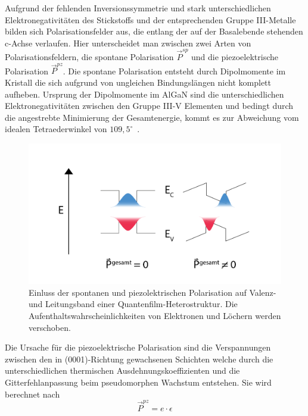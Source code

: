 Aufgrund der fehlenden Inversionssymmetrie und stark unterschiedlichen Elektronegativitäten des Stickstoffs und der entsprechenden Gruppe III-Metalle bilden sich Polarisationsfelder aus, die entlang der auf der Basalebende stehenden c-Achse verlaufen. Hier unterscheidet man zwischen zwei Arten von Polarisationsfeldern, die spontane Polarisation $ \vec{P}^{sp} $ und die piezoelektrische Polarisation $ \vec{P}^{pz} $. Die spontane Polarisation entsteht durch Dipolmomente im Kristall die sich aufgrund von ungleichen Bindungslängen nicht komplett aufheben. Ursprung der 
Dipolmomente im AlGaN sind die unterschiedlichen Elektronegativitäten zwischen den Gruppe III-V Elementen und bedingt durch die angestrebte Minimierung der Gesamtenergie, kommt es zur Abweichung vom idealen Tetraederwinkel von $109,5^{\circ}$~\cite{ambacher2002}.
%
\begin{figure}[htb]
    \centering
    \begin{minipage}[t]{1.0\linewidth}
        \centering
        \includegraphics[width=1\linewidth]{Bilder/QCSE.png}
    \end{minipage}%
    \caption{Einluss der spontanen und piezolektrischen Polarisation auf Valenz- und Leitungsband einer Quantenfilm-Heterostruktur. Die Aufenthaltswahrscheinlichkeiten von Elektronen und Löchern werden verschoben.}
        \label{fig:qcse}
\end{figure}
\noindent
Die Ursache für die piezoelektrische Polarisation sind die Verspannungen zwischen den in (0001)-Richtung gewachsenen Schichten welche durch die unterschiedlichen thermischen Ausdehnungskoeffizienten und die Gitterfehlanpassung beim pseudomorphen Wachstum entstehen. Sie wird berechnet nach
%
\begin{equation}
    \vec{P}^{pz} = e \cdot \epsilon
\end{equation}
